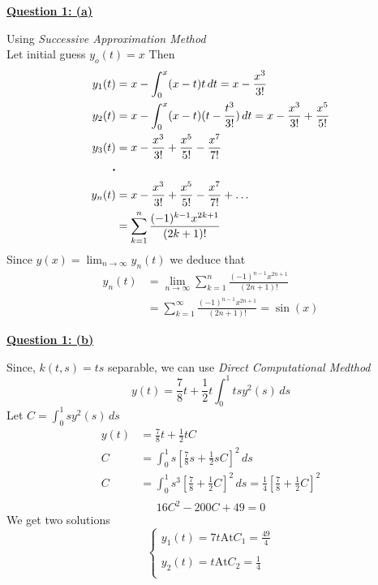 \documentclass[]{article}
\begin{document}
\textbf{\underline{Question 1: (a)}}
\begin{adjustwidth}{1cm}{2cm}
    Using \textit{Successive Approximation Method}\\
    Let initial guess $\displaystyle y_{o}(t) =x$ Then
    \begin{align*}
        y_1(t) & = x -\int_0^x (x-t)t \, dt = x-\frac{x^3}{3!}                                \\
        y_2(t) & = x -\int_0^x (x-t)(t-\frac{t^3}{3!})\, dt = x-\frac{x^3}{3!}+\frac{x^5}{5!} \\
        y_3(t) & = x-\frac{x^3}{3!}+\frac{x^5}{5!}-\frac{x^7}{7!} \\
        \vdot&\\
        y_n(t) & =x-\frac{x^3}{3!}+\frac{x^5}{5!}-\frac{x^7}{7!}+\dots\\
            & = \sum_{k=1}^{n}\frac{(-1)^{k-1}x^{2k+1}}{(2k+1)!}
    \end{align*}
    Since $\displaystyle y(x) = \lim_{n \to \infty} y_n(t)$ we deduce that 
    \begin{align*}
        y_n(t) & =\lim_{n \to \infty}\sum_{k=1}^{n} \frac{(-1)^{n-1}x^{2n+1}}{(2n+1)!}\\
                & =\sum_{k=1}^{\infty} \frac{(-1)^{n-1}x^{2n+1}}{(2n+1)!} = \sin(x)
    \end{align*}
\end{adjustwidth}
\textbf{\underline{Question 1: (b)}}
\begin{adjustwidth}{1cm}{2cm}
Since, $k(t,s)=ts$ separable, we can use \textit{Direct Computational Medthod}\\
\begin{equation*}
    y(t) = \frac{7}{8}t + \frac{1}{2}t \int_0^1 ts y^2(s) \, ds
\end{equation*}
Let $\displaystyle C=\int_0^1 s y^2(s) \, ds$
\begin{align*}
    y(t) & = \frac{7}{8}t + \frac{1}{2}tC                                                                                       \\
    C    & = \int_0^1 s \left[\frac{7}{8}s + \frac{1}{2}sC\right]^2 \,ds                                                        \\
    C    & = \int_0^1 s^3 \left[\frac{7}{8} + \frac{1}{2}C\right]^2 \,ds = \frac{1}{4}\left[\frac{7}{8} + \frac{1}{2}C\right]^2 \\
\end{align*}
\begin{equation*}
    16C^2 -200C+49=0
\end{equation*}
We get two solutions
\[
    \begin{cases}
        \displaystyle y_1(t) = 7t \text{At} C_1 = \frac{49}{4} \\\\
        \displaystyle y_2(t) = t \text{At} C_2 = \frac{1}{4}   \\
    \end{cases}    
\]
\end{adjustwidth}
\end{document}
